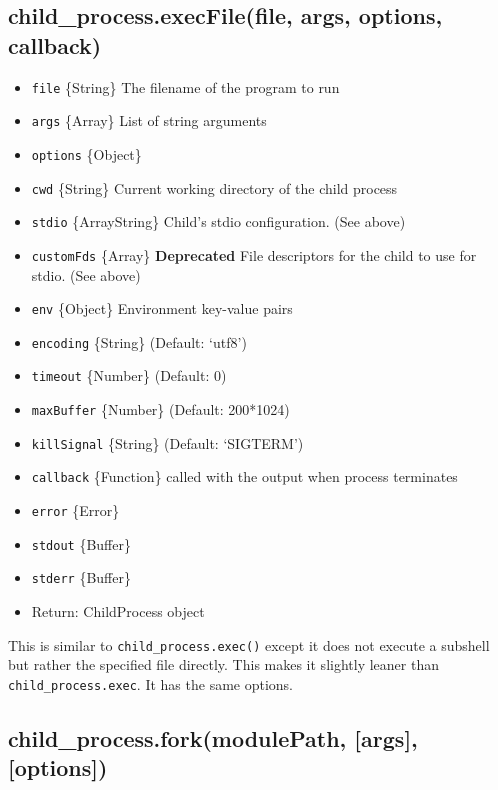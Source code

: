 \subsection{child\_process.execFile(file, args, options, callback)}

\begin{itemize}
\item
  \texttt{file} \{String\} The filename of the program to run
\item
  \texttt{args} \{Array\} List of string arguments
\item
  \texttt{options} \{Object\}
\item
  \texttt{cwd} \{String\} Current working directory of the child process
\item
  \texttt{stdio} \{Array\textbar{}String\} Child's stdio configuration.
  (See above)
\item
  \texttt{customFds} \{Array\} \textbf{Deprecated} File descriptors for
  the child to use for stdio. (See above)
\item
  \texttt{env} \{Object\} Environment key-value pairs
\item
  \texttt{encoding} \{String\} (Default: `utf8')
\item
  \texttt{timeout} \{Number\} (Default: 0)
\item
  \texttt{maxBuffer} \{Number\} (Default: 200*1024)
\item
  \texttt{killSignal} \{String\} (Default: `SIGTERM')
\item
  \texttt{callback} \{Function\} called with the output when process
  terminates
\item
  \texttt{error} \{Error\}
\item
  \texttt{stdout} \{Buffer\}
\item
  \texttt{stderr} \{Buffer\}
\item
  Return: ChildProcess object
\end{itemize}

This is similar to \texttt{child\_process.exec()} except it does not
execute a subshell but rather the specified file directly. This makes it
slightly leaner than \texttt{child\_process.exec}. It has the same
options.

\subsection{child\_process.fork(modulePath, {[}args{]}, {[}options{]})}

